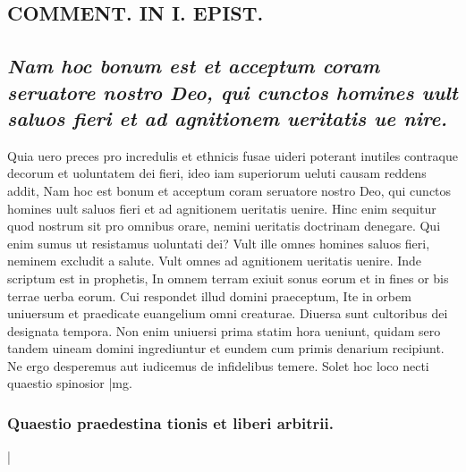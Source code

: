 \documentclass{article}
\begin{document}
\begin{pages}
\section*{COMMENT. IN I. EPIST. }
{}
\subsection*{\textit{Nam hoc bonum est et acceptum coram seruatore nostro Deo, qui cunctos homines uult saluos fieri et ad agnitionem ueritatis ue nire. }}\pstart Quia uero preces pro incredulis et ethnicis fusae uideri poterant inutiles contraque decorum et uoluntatem dei fieri, ideo iam superiorum ueluti causam reddens addit, Nam hoc est bonum et acceptum coram seruatore nostro Deo, qui cunctos homines uult saluos fieri et ad agnitionem ueritatis uenire. Hinc enim sequitur quod nostrum sit pro omnibus orare, nemini ueritatis doctrinam denegare. Qui enim sumus ut resistamus uoluntati dei? Vult ille omnes homines saluos fieri, neminem excludit a salute. Vult omnes ad agnitionem ueritatis uenire. Inde scriptum est in prophetis, In omnem terram exiuit sonus eorum et in fines or bis terrae uerba eorum. Cui respondet illud domini praeceptum, Ite in orbem uniuersum et praedicate euangelium omni creaturae. Diuersa sunt cultoribus dei designata tempora. Non enim uniuersi prima statim hora ueniunt, quidam sero tandem uineam domini ingrediuntur et eundem cum primis denarium recipiunt. Ne ergo desperemus aut iudicemus de infidelibus temere. Solet hoc loco necti quaestio spinosior  \pend
|mg. \subsubsection*{Quaestio praedestina tionis et liberi arbitrii. }|

\end{pages}
\end{document}
